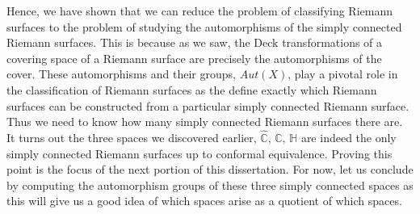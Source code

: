 \documentclass[11pt]{report}
\theoremstyle{definition}
\begin{document}
Hence, we have shown that we can reduce the problem of classifying Riemann surfaces to the problem of studying the automorphisms of the simply connected Riemann surfaces. This is because as we saw, the Deck transformations of a covering space of a Riemann surface are precisely the automorphisms of the cover. These automorphisms and their groups, $Aut(X)$, play a pivotal role in the classification of Riemann surfaces as the define exactly which Riemann surfaces can be constructed from a particular simply connected Riemann surface. Thus we need to know how many simply connected Riemann surfaces there are. It turns out the three spaces we discovered earlier, $\widehat{\mathbb{C}},\, \mathbb{C},\,\mathbb{H}$ are indeed the only simply connected Riemann surfaces up to conformal equivalence. Proving this point is the focus of the next portion of this dissertation. For now, let us conclude by computing the automorphism groups of these three simply connected spaces as this will give us a good idea of which spaces arise as a quotient of which spaces.
\end{document}
